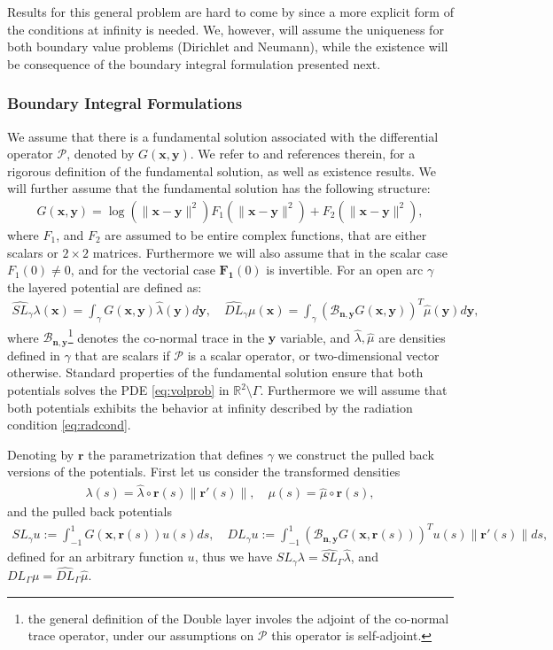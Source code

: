 \documentclass{article}
\newcommand{\vx}{\bm{x}}
\newcommand{\IR}{{\mathbb R}}
\newcommand{\cP}{\mathcal{P}}
\newcommand{\bn}{\bm{n}}
\newcommand{\br}{\bm{r}}
\newcommand{\bx}{\bm{x}}
\newcommand{\by}{\bm{y}}
\begin{document}
Results for this general problem are hard to come by since a more explicit form of the conditions at infinity is needed. We, however, will assume the uniqueness for both boundary value problems (Dirichlet and Neumann), while the existence will be consequence of the boundary integral formulation presented next. 
\subsubsection{Boundary Integral Formulations}
\label{sec:bif}
We assume that there is a fundamental solution associated with the differential operator $\cP$, denoted by $G(\vx,\by)$. We refer to \cite[Chapter 6]{mclean2000strongly} and references therein, for a rigorous definition of the fundamental solution, as well as existence results.
 We will further assume that the fundamental solution has the following structure:
\begin{align}
\label{eq:funsolgen}
G(\bx,\by )  =
\log (\|\bx -\by \|^2) F_1(\|\bx -\by \| ^2)+F_2(\|\bx -\by \| ^2),
\end{align}
where $F_1$, and $F_2$ are assumed to be entire complex functions, that are either scalars or $2 \times 2$ matrices. Furthermore we will also assume that in the scalar case $F_1(0) \neq 0$, and for the vectorial case $\mathbf{F_1}(0)$ is invertible. For an open arc $\gamma$ the layered potential are defined as:
\begin{align*}
\widehat{SL}_\gamma \lambda(\bx) = \int_\gamma G(\bx,\by) \widehat{\lambda}(\by) d\by, \quad \widehat{DL}_\gamma \mu(\bx) = \int_\gamma \left(\mathcal{B}_{\bn,\by} G(\bx,\by) \right)^T \widehat{\mu}(\by) d\by,
\end{align*} 
where $\mathcal{B}_{\bn,\by}$\footnote{the general definition of the Double layer involes the adjoint of the co-normal trace operator, under our assumptions on $\cP$ this operator is self-adjoint. } denotes the co-normal trace in the $\by$ variable, and $\widehat{\lambda}, \widehat{\mu}$ are densities defined in $\gamma$ that are scalars if $\cP$ is a scalar operator, or two-dimensional vector otherwise. Standard properties of the fundamental solution ensure that  both potentials solves the PDE \eqref{eq:volprob} in $\IR^2 \setminus \Gamma$. Furthermore we will assume that both potentials exhibits the behavior at infinity described by the radiation condition \eqref{eq:radcond}. 

Denoting by $\br$ the parametrization that defines $\gamma$ we construct the pulled back versions of the potentials. First let us consider the transformed densities 
\begin{align*}
\lambda (s) = \widehat{\lambda} \circ \br(s)  \| \br'(s) \|, \quad 
\mu (s) = \widehat{\mu} \circ \br(s),
\end{align*}
and the pulled back potentials 
\begin{align*}
{SL}_{\gamma} u := \int_{-1}^1 
 G(\bx,\br(s))  u(s) ds, \quad 
 {DL}_{\gamma} u := \int_{-1}^1 
 \left(\mathcal{B}_{\bn,\by}G(\bx,\br(s))\right)^T  u(s) \|\br'(s)\|ds,
\end{align*}
defined for an arbitrary function $u$, thus we have $SL_\gamma \lambda  = \widehat{SL}_\Gamma \widehat{\lambda}$, and $DL_\Gamma \mu  = \widehat{DL}_\Gamma \widehat{\mu}$. 
\end{document}
